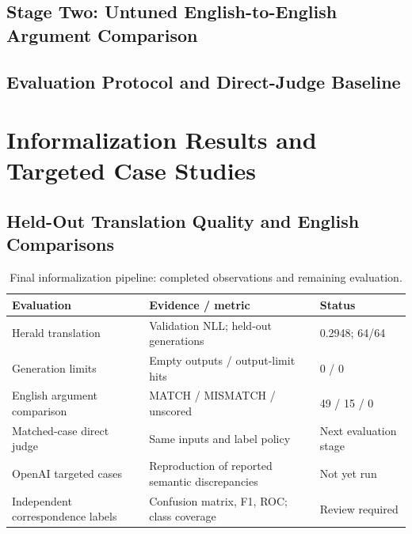 \documentclass[sigconf,nonacm]{acmart}
\newcommand{\draftspace}{\mbox{}\par\smallskip}
\begin{document}
\subsection{Stage Two: Untuned English-to-English Argument Comparison}
\draftspace
\subsection{Evaluation Protocol and Direct-Judge Baseline}
\draftspace

\section{Informalization Results and Targeted Case Studies}
\subsection{Held-Out Translation Quality and English Comparisons}
\draftspace
\begin{table}[htbp]
\centering\small
\caption{Final informalization pipeline: completed observations and remaining evaluation.}
\begin{tabular}{lll}
\toprule
Evaluation & Evidence / metric & Status \\
\midrule
Herald translation & Validation NLL; held-out generations & 0.2948; 64/64 \\
Generation limits & Empty outputs / output-limit hits & 0 / 0 \\
English argument comparison & MATCH / MISMATCH / unscored & 49 / 15 / 0 \\
Matched-case direct judge & Same inputs and label policy & Next evaluation stage \\
OpenAI targeted cases & Reproduction of reported semantic discrepancies & Not yet run \\
Independent correspondence labels & Confusion matrix, F1, ROC; class coverage & Review required \\
\bottomrule
\end{tabular}
\end{table}
\end{document}
